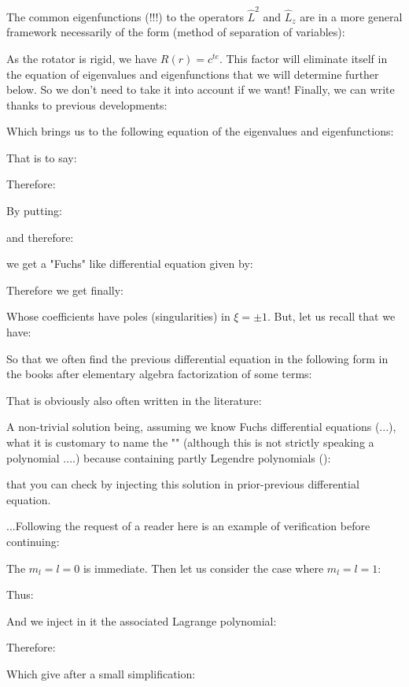 	The common eigenfunctions (!!!) to the operators $\hat{L}^2$ and $\hat{L}_z$ are in a more general framework necessarily of the form (method of separation of variables):
	
	As the rotator is rigid, we have $R(r)=c^{te}$. This factor will eliminate itself in the equation of eigenvalues and eigenfunctions that we will determine further below. So we don't need to take it into account if we want! Finally, we can write thanks to previous developments:
	
	Which brings us to the following equation of the eigenvalues and eigenfunctions:
	
	That is to say:
	
	Therefore:
	
	By putting:
	
	and therefore:
	
	we get a "Fuchs" like differential equation given by:
	
	Therefore we get finally:
	
	Whose coefficients have poles (singularities) in $\xi=\pm 1$. But, let us recall that we have:
	
	So that we often find the previous differential equation in the following form in the books after elementary algebra factorization of some terms:
	
	That is obviously also often written in the literature\label{polar equation rigid rotator}:
	
	A non-trivial solution being, assuming we know Fuchs differential equations (...), what it is customary to name the "\label{legendre polynomial}" (although this is not strictly speaking a polynomial ....) because containing partly Legendre polynomials ():
	
	that you can check by injecting this solution in prior-previous differential equation.
	
	...Following the request of a reader here is an example of verification before continuing:
	
	The $m_l=l=0$ is immediate. Then let us consider the case where $m_l=l=1$:
	
	Thus:
	
	And we inject in it the associated Lagrange polynomial:
	
	Therefore:
	
	Which give after a small simplification:
	
